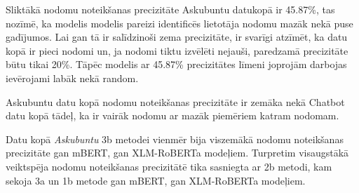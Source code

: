 Sliktākā nodomu noteikšanas precizitāte Askubuntu datukopā ir 45.87\%, tas nozīmē, ka modelis modelis pareizi identificēs lietotāja nodomu mazāk nekā puse gadījumos. Lai gan tā ir salīdzinoši zema precizitāte, ir svarīgi atzīmēt, ka datu kopā ir pieci nodomi un, ja nodomi tiktu izvēlēti nejauši, paredzamā precizitāte būtu tikai 20\%. Tāpēc modelis ar 45.87\% precizitātes līmeni joprojām darbojas ievērojami labāk nekā random.

Askubuntu datu kopā nodomu noteikšanas precizitāte ir zemāka nekā Chatbot datu kopā tādeļ, ka ir vairāk nodomu ar mazāk piemēriem katram nodomam.

Datu kopā \textit{Askubuntu} 3b metodei vienmēr bija viszemākā nodomu noteikšanas precizitāte gan mBERT, gan XLM-RoBERTa modeļiem. Turpretim visaugstākā veiktspēja nodomu noteikšanas precizitātē tika sasniegta ar 2b metodi, kam sekoja 3a un 1b metode gan mBERT, gan XLM-RoBERTa modeļiem.


